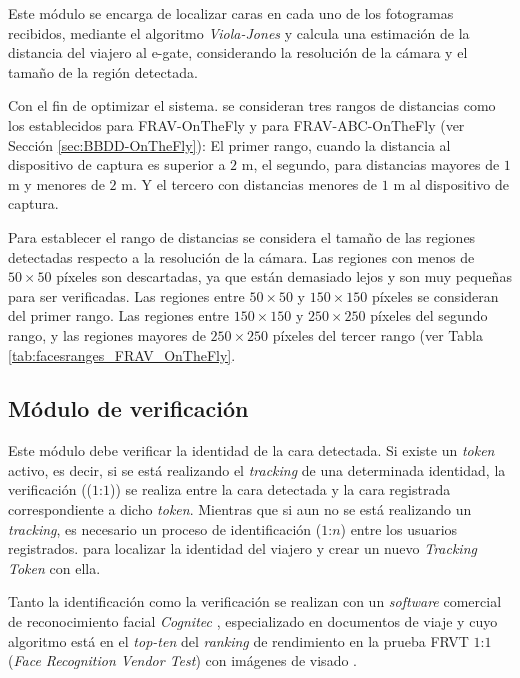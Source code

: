 Este módulo se encarga de localizar caras en cada uno de los fotogramas recibidos, mediante el algoritmo \textit{Viola-Jones} \cite{viola2004robust} y calcula una estimación de la distancia del viajero al \gls{e-gate}, considerando la resolución de la cámara y el tamaño de la región detectada.

Con el fin de optimizar el sistema. se consideran tres rangos de distancias como los establecidos para \Gls{FRAV-OnTheFly} y para \Gls{FRAV-ABC-OnTheFly} (ver Sección \ref{sec:BBDD-OnTheFly}): El primer rango, cuando la distancia al dispositivo de captura es superior a $2$ m, el segundo, para distancias mayores de $1$ m y menores de $2$ m. Y el tercero con distancias menores de $1$ m al dispositivo de captura. 

Para establecer el rango de distancias se considera el tamaño de las regiones detectadas respecto a la resolución de la cámara. Las regiones con menos de $50\times50$ píxeles son descartadas, ya que están demasiado lejos y son muy pequeñas para ser verificadas. Las regiones entre $50\times50$ y $150\times150$ píxeles se consideran del primer rango. Las regiones entre $150 \times 150$ y $250\times250$ píxeles del segundo rango, y las regiones mayores de $250\times250$ píxeles del tercer rango (ver Tabla \ref{tab:facesranges_FRAV_OnTheFly}. 

\subsection{Módulo de verificación}

Este módulo debe verificar la identidad de la cara detectada. Si existe un \textit{token} activo, es decir, si se está realizando el \textit{tracking} de una determinada identidad, la verificación (($1$:$1$)) se realiza entre la cara detectada y la cara registrada correspondiente a dicho \textit{token}. Mientras que si aun no se está realizando un \textit{tracking}, es necesario un proceso de identificación ($1$:$n$) entre los usuarios registrados. para localizar la identidad del viajero y crear un nuevo \textit{Tracking Token} con ella.

Tanto la identificación como la verificación se realizan con un \textit{software} comercial de reconocimiento facial \textit{Cognitec} \cite{cognitec2019url}, especializado en documentos de viaje y cuyo algoritmo está en el \textit{top-ten} del \textit{ranking} de rendimiento en la prueba  FRVT $1$:$1$ (\textit{Face Recognition Vendor Test}) con imágenes de visado \cite{chen2016unconstrained}.

